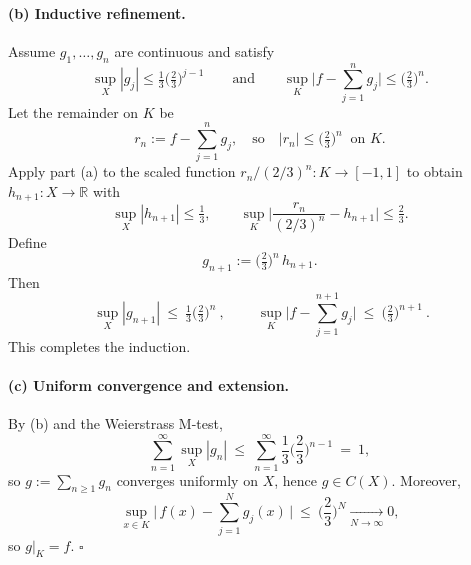 \documentclass[12pt,a4paper]{article}
\newcommand{\qed}{\hfill$\square$}
\theoremstyle{plain}
\theoremstyle{definition}
\theoremstyle{remark}
\theoremstyle{remark}
\begin{document}
\medskip

\paragraph{(b) Inductive refinement.}
Assume $g_1,\dots,g_n$ are continuous and satisfy
\[
\sup_X|g_j|\le \tfrac{1}{3}\Big(\tfrac{2}{3}\Big)^{j-1}
\qquad\text{and}\qquad
\sup_K\Big|f-\sum_{j=1}^n g_j\Big|\le \Big(\tfrac{2}{3}\Big)^n.
\]
Let the remainder on $K$ be
\[
r_n:=f-\sum_{j=1}^n g_j,
\quad\text{so}\quad
|r_n|\le \Big(\tfrac{2}{3}\Big)^n \ \text{ on }K.
\]
Apply part (a) to the scaled function $r_n/(2/3)^n:K\to[-1,1]$ to obtain
$h_{n+1}:X\to\mathbb R$ with
\[
\sup_X|h_{n+1}|\le\tfrac{1}{3},
\qquad
\sup_K\Big|\frac{r_n}{(2/3)^n}-h_{n+1}\Big|\le \tfrac{2}{3}.
\]
Define
\[
g_{n+1}:=\Big(\tfrac{2}{3}\Big)^n\,h_{n+1}.
\]
Then
\[
\boxed{\ \sup_X|g_{n+1}|\ \le\ \tfrac{1}{3}\Big(\tfrac{2}{3}\Big)^n\ },
\qquad
\boxed{\ \sup_K\Big|f-\sum_{j=1}^{n+1} g_j\Big|\ \le\ \Big(\tfrac{2}{3}\Big)^{n+1}\ }.
\]
This completes the induction.

\medskip

\paragraph{(c) Uniform convergence and extension.}
By (b) and the Weierstrass M-test,
\[
\sum_{n=1}^\infty \sup_X|g_n|
\ \le\ 
\sum_{n=1}^\infty \frac{1}{3}\Big(\frac{2}{3}\Big)^{n-1}
\ =\ 1,
\]
so $g:=\sum_{n\ge1} g_n$ converges uniformly on $X$, hence $g\in C(X)$.
Moreover,
\[
\sup_{x\in K}\Big|\,f(x)-\sum_{j=1}^{N} g_j(x)\,\Big|\ \le\ \Big(\frac{2}{3}\Big)^{N}\xrightarrow[N\to\infty]{}0,
\]
so $g|_K=f$. \qed

	
	

	
	
\end{document}
